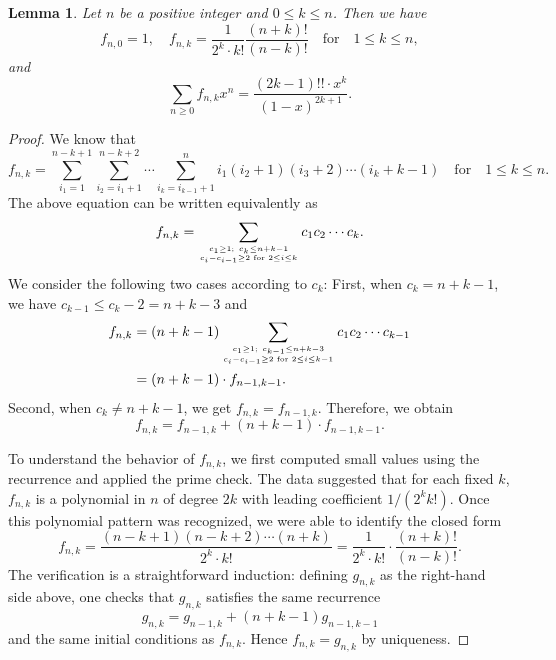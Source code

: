 \documentclass[reqno, 12pt]{article}
\newtheorem{lem}[thm]{Lemma}
\theoremstyle{mydefinition}
\theoremstyle{myremark}
\numberwithin{algorithm}{section}
\begin{document}
\begin{lem}\label{fnk-closed-formula}
Let $n$ be a positive integer and $0\leq k\leq n$. Then we have
\begin{equation}\label{eq:fnkclose}
f_{n,0}=1,\quad f_{n,k}=\frac{1}{2^k\cdot k!}\frac{(n+k)!}{(n-k)!} \quad \text{for}\quad 1\leq k\leq n,
\end{equation}
and
\begin{equation}
\sum_{n\geq 0}f_{n,k}x^n=\frac{(2k-1)!!\cdot x^k}{(1-x)^{2k+1}}.
\end{equation}
\end{lem}
\begin{proof}
We know that
\begin{equation*}
f_{n,k}=\sum_{i_1=1}^{n-k+1}\sum_{i_2=i_1+1}^{n-k+2}\cdots \sum_{i_k=i_{k-1}+1}^{n} i_1(i_2+1)(i_3+2)\cdots (i_k+k-1)\quad \text{for}\quad 1\leq k\leq n.
\end{equation*}
The above equation can be written equivalently as
\begin{equation*}
f_{n,k}=\sum_{c_1\geq 1;\ c_k\leq n+k-1 \atop c_{i}-c_{i-1}\geq 2 \text{ for } 2\leq i\leq k} c_1c_2\cdots c_k.
\end{equation*}
We consider the following two cases according to $c_k$:
First, when $c_k=n+k-1$, we have $c_{k-1}\leq c_k-2=n+k-3$ and
\begin{align*}
f_{n,k}&=(n+k-1)\sum_{c_1\geq 1;\ c_{k-1}\leq n+k-3 \atop c_{i}-c_{i-1}\geq 2 \text{ for } 2\leq i\leq k-1} c_1c_2\cdots c_{k-1}
\\ &=(n+k-1)\cdot f_{n-1,k-1}.
\end{align*}
Second, when $c_k\neq n+k-1$, we get $f_{n,k}=f_{n-1,k}$. Therefore, we obtain
\begin{equation*}
f_{n,k}=f_{n-1,k}+ (n+k-1)\cdot f_{n-1,k-1}.
\end{equation*}

To understand the behavior of $f_{n,k}$, we first computed small values using the recurrence and applied the prime check.
The data suggested that for each fixed $k$, $f_{n,k}$ is a polynomial in $n$ of degree $2k$ with leading coefficient $1/(2^k k!)$.
Once this polynomial pattern was recognized, we were able to identify the closed form
\begin{equation*}
f_{n,k}=\frac{(n-k+1)(n-k+2)\cdots (n+k)}{2^k\cdot k!}
      =\frac{1}{2^k\cdot k!}\cdot \frac{(n+k)!}{(n-k)!}.
\end{equation*}
The verification is a straightforward induction: defining $g_{n,k}$ as the right-hand side above, one checks that $g_{n,k}$ satisfies the same recurrence
\[
g_{n,k}=g_{n-1,k}+(n+k-1)g_{n-1,k-1}
\]
and the same initial conditions as $f_{n,k}$.
Hence $f_{n,k}=g_{n,k}$ by uniqueness.


\end{proof}
\end{document}
